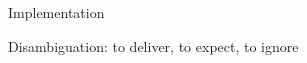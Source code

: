 \documentclass[10pt, xcolor={usenames, dvipsnames}]{beamer}
\begin{document}
\begin{frame}{Implementation}
\end{frame}


  

%     
%     
%     

%     
%     
%     

%     
%             
    



\begin{frame}{Disambiguation: to deliver, to expect, to ignore}
  
  \begin{adjustwidth}{-1.5em}{-1.5em}
    \begin{center}
    
    \end{center}

    \vspace{2em}

    
  \end{adjustwidth}

\end{frame}
\end{document}
